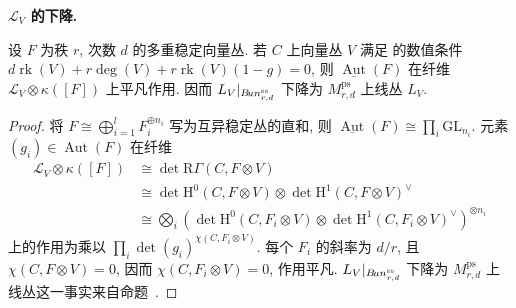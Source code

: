 \textbf{$\mathcal L_V$ 的下降.}
\begin{proposition}\label{src:9.4.29}
设 $F$ 为秩 $r$, 次数 $d$ 的多重稳定向量丛. 若 $C$ 上向量丛 $V$ 满足  的数值条件 $d\operatorname{rk}(V)+r\deg(V)+r\operatorname{rk}(V)(1-g)=0$, 则 $\underline{\operatorname{Aut}}(F)$ 在纤维 $\mathcal L_V\otimes\kappa([F])$ 上平凡作用. 因而 $L_V|_{B\!un_{r,d}^{\mathrm{ss}}}$ 下降为 $M_{r,d}^{\mathrm{ps}}$ 上线丛 $L_V$.
\end{proposition}
\begin{proof}
将 $F\cong\bigoplus_{i=1}^lF_i^{\oplus n_i}$ 写为互异稳定丛的直和, 则 $\underline{\operatorname{Aut}}(F)\cong\prod_i\mathrm{GL}_{n_i}$. 元素 $(g_i)\in\operatorname{Aut}(F)$ 在纤维
\[
\begin{aligned}
\mathcal L_V\otimes\kappa([F])&\cong\det\mathrm R\Gamma(C,F\otimes V)\\
&\cong\det\mathrm H^0(C,F\otimes V)\otimes\det\mathrm H^1(C,F\otimes V)^\vee\\
&\cong\bigotimes_i\left(\det\mathrm H^0(C,F_i\otimes V)\otimes\det\mathrm H^1(C,F_i\otimes V)^\vee\right)^{\otimes n_i}
\end{aligned}
\]
上的作用为乘以 $\prod_i\det(g_i)^{\chi(C,F_i\otimes V)}$. 每个 $F_i$ 的斜率为 $d/r$, 且 $\chi(C,F\otimes V)=0$, 因而 $\chi(C,F_i\otimes V)=0$, 作用平凡. $L_V|_{B\!un_{r,d}^{\mathrm{ss}}}$ 下降为 $M_{r,d}^{\mathrm{ps}}$ 上线丛这一事实来自命题~.
\end{proof}
